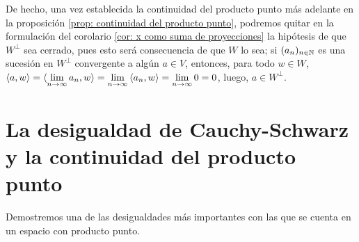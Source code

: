 \begin{nota}
De hecho, una vez establecida la continuidad
del producto punto más adelante en la
proposición \ref{prop: continuidad del producto punto}, podremos
quitar en la formulación del corolario 
\ref{cor: x como suma de proyecciones}
la hipótesis de que $W^{\perp}$ sea cerrado, pues esto
será consecuencia de que $W$ lo sea; si $(a_{n})_{n \in \mathbb{N}}$
es una sucesión en $W^{\perp}$ convergente a algún $a \in V$,
entonces, para todo $w \in W$,
$\langle a, w \rangle = 
\langle \lim\limits_{n \rightarrow \infty}{a_{n}}, w \rangle
= \lim\limits_{n \rightarrow \infty}{\langle a_{n},w \rangle}=
\lim\limits_{n \rightarrow \infty}{0}=0$,
luego, $a \in W^{\perp}$.
\end{nota}


\section{La desigualdad de Cauchy-Schwarz y la continuidad del producto punto}
\noindent Demostremos 
una de las desigualdades
más importantes con las que se cuenta en un espacio
con producto punto.

